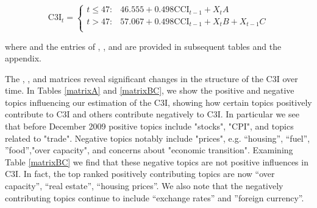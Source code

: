\documentclass[10pt]{article}
\begin{document}
 \begin {equation}
\mbox{C3I}_t =
 \begin {cases}

t\leq 47:	&	46.555+0.498\mbox{CCI}_{t-1}+X_t A				\\
t >47: 	&	57.067+0.498\mbox{CCI}_{t-1}+X_t B+ X_{t-1} C		\\

\end{cases}
\label{fitted}
\end {equation}

where  and the entries of , , and  are provided in subsequent tables and the appendix.

The  , , and  matrices reveal significant changes in the structure of the C3I over time. In Tables \ref{matrixA} and \ref{matrixBC}, we show the positive and negative topics influencing our estimation of the C3I, showing how certain topics positively contribute to C3I and others contribute negatively to C3I. In particular we see that before December 2009 positive topics include "stocks", "CPI", and topics related to "trade". Negative topics notably include "prices", e.g. ``housing'', ``fuel'', ''food'',"over capacity", and concerns about "economic transition". Examining Table \ref{matrixBC} we find that these negative topics are not positive influences in C3I. In fact, the top ranked positively contributing topics are now ``over capacity'', ``real estate'', ``housing prices''. We also note that the negatively contributing topics continue to include ``exchange rates'' and ''foreign currency''.
\end{document}

